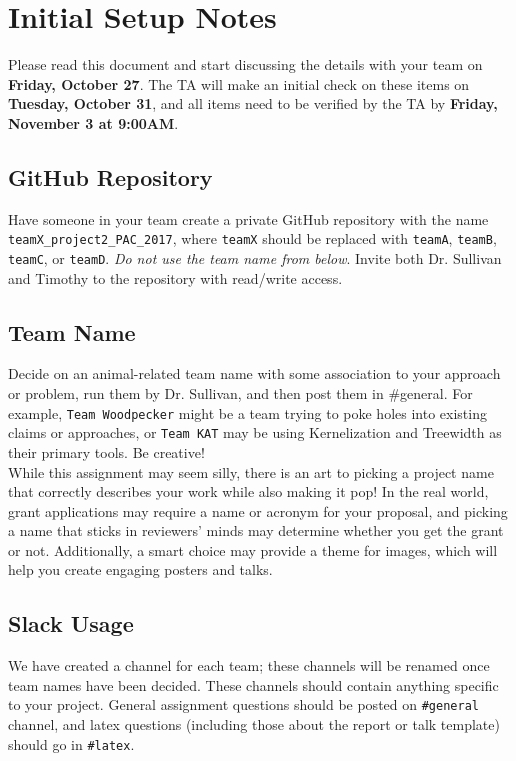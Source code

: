 \documentclass{article}
\begin{document}
\section*{Initial Setup Notes}
Please read this document and start discussing the details with your team on \textbf{Friday, October 27}. The TA will make an initial check on these items on \textbf{Tuesday, October 31}, and all items need to be verified by the TA by \textbf{Friday, November 3 at 9:00AM}.

\subsection*{GitHub Repository}

Have someone in your team create a private GitHub repository with the name \texttt{teamX\_project2\_PAC\_2017}, where \texttt{teamX} should be replaced with \texttt{teamA}, \texttt{teamB}, \texttt{teamC}, or \texttt{teamD}. \emph{Do not use the team name from below}. Invite both Dr. Sullivan and Timothy to the repository with read/write access.

\subsection*{Team Name}
Decide on an animal-related team name with some association to your approach or problem, run them by Dr. Sullivan, and then post them in \#general. For example, \texttt{Team Woodpecker} might be a team trying to poke holes into existing claims or approaches, or \texttt{Team KAT} may be using Kernelization and Treewidth as their primary tools. Be creative!\\

While this assignment may seem silly, there is an art to picking a project name that correctly describes your work while also making it pop! In the real world, grant applications may require a name or acronym for your proposal, and picking a name that sticks in reviewers'  minds may determine whether you get the grant or not. Additionally, a smart choice may provide a theme for images, which will help you create engaging posters and talks.

\subsection*{Slack Usage}

We have created a channel for each team; these channels will be renamed once team names have been decided. These channels should  contain anything specific to your project. General assignment questions should be posted on \texttt{\#general} channel, and latex questions (including those about the report or talk template) should go in \texttt{\#latex}.
\end{document}
